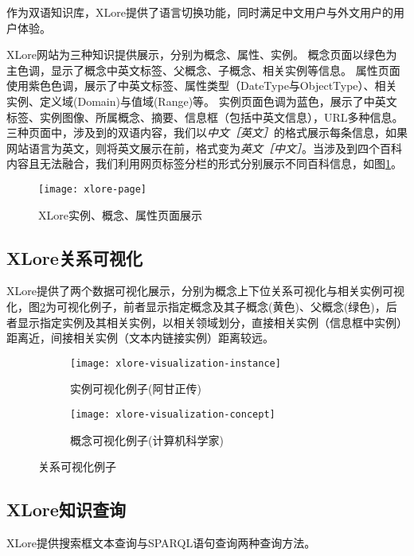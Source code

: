 作为双语知识库，XLore提供了语言切换功能，同时满足中文用户与外文用户的用户体验。

XLore网站为三种知识提供展示，分别为概念、属性、实例。
概念页面以绿色为主色调，显示了概念中英文标签、父概念、子概念、相关实例等信息。
属性页面使用紫色色调，展示了中英文标签、属性类型（DateType与ObjectType）、相关实例、定义域(Domain)与值域(Range)等。 
实例页面色调为蓝色，展示了中英文标签、实例图像、所属概念、摘要、信息框（包括中英文信息），URL多种信息。三种页面中，涉及到的双语内容，我们以\textit{中文［英文］}的格式展示每条信息，如果网站语言为英文，则将英文展示在前，格式变为\textit{英文［中文］}。当涉及到四个百科内容且无法融合，我们利用网页标签分栏的形式分别展示不同百科信息，如图\ref{fig:xlore-page}。

\begin{figure}[H] 
  \centering
  \texttt{[image: xlore-page]}
  \caption{XLore实例、概念、属性页面展示}
  \label{fig:xlore-page}
\end{figure}

\subsection{XLore关系可视化}

XLore提供了两个数据可视化展示，分别为概念上下位关系可视化与相关实例可视化，图\ref{fig:xlore-visualization}为可视化例子，前者显示指定概念及其子概念(黄色)、父概念(绿色)，后者显示指定实例及其相关实例，以相关领域划分，直接相关实例（信息框中实例）距离近，间接相关实例（文本内链接实例）距离较远。

\begin{figure}[H] 
  \centering
  \begin{subfigure}{3cm}
    \texttt{[image: xlore-visualization-instance]}
    \caption{实例可视化例子(阿甘正传)}
  \end{subfigure}
  \hspace{4em}%
  \begin{subfigure}{0.8\textwidth}
    \texttt{[image: xlore-visualization-concept]}
    \caption{概念可视化例子(计算机科学家)}
  \end{subfigure}
  \caption{关系可视化例子}
  \label{fig:xlore-visualization}
\end{figure}

\subsection{XLore知识查询}
XLore提供搜索框文本查询与SPARQL语句查询两种查询方法。

